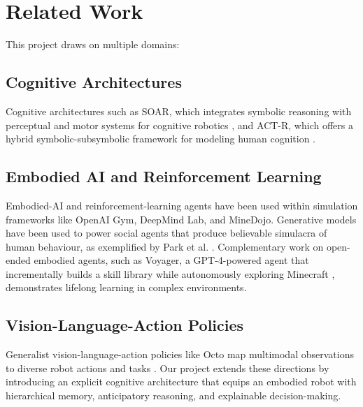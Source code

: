 \documentclass[../report.tex]{subfiles}
\begin{document}
\section{Related Work}
\label{sec:related_work}

This project draws on multiple domains:

\subsection{Cognitive Architectures}
Cognitive architectures such as SOAR, which integrates symbolic reasoning with perceptual and motor systems for cognitive robotics \cite{soar}, and ACT-R, which offers a hybrid symbolic-subsymbolic framework for modeling human cognition \cite{actr}.

\subsection{Embodied AI and Reinforcement Learning}
Embodied-AI and reinforcement-learning agents have been used within simulation frameworks like OpenAI Gym, DeepMind Lab, and MineDojo. Generative models have been used to power social agents that produce believable simulacra of human behaviour, as exemplified by Park et al. \cite{generativeagents}. Complementary work on open-ended embodied agents, such as Voyager, a GPT-4-powered agent that incrementally builds a skill library while autonomously exploring Minecraft \cite{voyager}, demonstrates lifelong learning in complex environments.

\subsection{Vision-Language-Action Policies}
Generalist vision-language-action policies like Octo map multimodal observations to diverse robot actions and tasks \cite{octo}. Our project extends these directions by introducing an explicit cognitive architecture that equips an embodied robot with hierarchical memory, anticipatory reasoning, and explainable decision-making.
\end{document}
